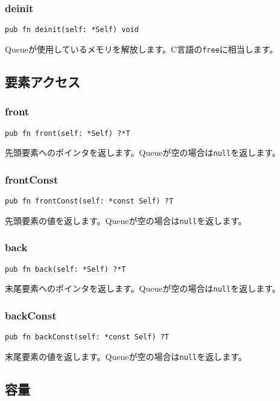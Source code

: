 \documentclass{ltjsarticle}
\begin{document}
\subsubsection{deinit}
\begin{lstlisting}[style=zigstyle]
pub fn deinit(self: *Self) void
\end{lstlisting}
Queueが使用しているメモリを解放します。C言語の\texttt{free}に相当します。

\subsection{要素アクセス}

\subsubsection{front}
\begin{lstlisting}[style=zigstyle]
pub fn front(self: *Self) ?*T
\end{lstlisting}
先頭要素へのポインタを返します。Queueが空の場合は\texttt{null}を返します。

\subsubsection{frontConst}
\begin{lstlisting}[style=zigstyle]
pub fn frontConst(self: *const Self) ?T
\end{lstlisting}
先頭要素の値を返します。Queueが空の場合は\texttt{null}を返します。

\subsubsection{back}
\begin{lstlisting}[style=zigstyle]
pub fn back(self: *Self) ?*T
\end{lstlisting}
末尾要素へのポインタを返します。Queueが空の場合は\texttt{null}を返します。

\subsubsection{backConst}
\begin{lstlisting}[style=zigstyle]
pub fn backConst(self: *const Self) ?T
\end{lstlisting}
末尾要素の値を返します。Queueが空の場合は\texttt{null}を返します。

\subsection{容量}
\end{document}

